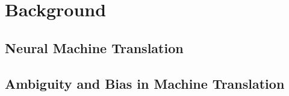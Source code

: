 \chapter{Background}
\label{ch:Background}


\section{Neural Machine Translation}
\label{sec:Introduction:NMT}

\section{Ambiguity and Bias in Machine Translation}
\label{sec:Introduction:Ambiguity_Bias}